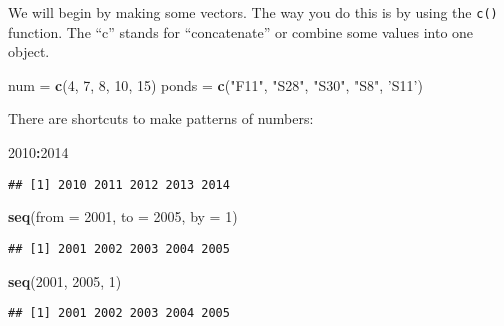 \documentclass[]{book}
\newenvironment{Shaded}{\begin{snugshade}}{\end{snugshade}}
\newcommand{\KeywordTok}[1]{\textcolor[rgb]{0.13,0.29,0.53}{\textbf{#1}}}
\newcommand{\DataTypeTok}[1]{\textcolor[rgb]{0.13,0.29,0.53}{#1}}
\newcommand{\DecValTok}[1]{\textcolor[rgb]{0.00,0.00,0.81}{#1}}
\newcommand{\StringTok}[1]{\textcolor[rgb]{0.31,0.60,0.02}{#1}}
\newcommand{\OperatorTok}[1]{\textcolor[rgb]{0.81,0.36,0.00}{\textbf{#1}}}
\newcommand{\NormalTok}[1]{#1}
\theoremstyle{definition}
\theoremstyle{definition}
\theoremstyle{definition}
\theoremstyle{remark}
\begin{document}
We will begin by making some vectors. The way you do this is by using
the \texttt{c()} function. The ``c'' stands for ``concatenate'' or
combine some values into one object.

\begin{Shaded}
\begin{Highlighting}[]
\NormalTok{num =}\StringTok{ }\KeywordTok{c}\NormalTok{(}\DecValTok{4}\NormalTok{, }\DecValTok{7}\NormalTok{, }\DecValTok{8}\NormalTok{, }\DecValTok{10}\NormalTok{, }\DecValTok{15}\NormalTok{)}
\NormalTok{ponds =}\StringTok{ }\KeywordTok{c}\NormalTok{(}\StringTok{"F11"}\NormalTok{, }\StringTok{"S28"}\NormalTok{, }\StringTok{"S30"}\NormalTok{, }\StringTok{"S8"}\NormalTok{, }\StringTok{'S11'}\NormalTok{)}
\end{Highlighting}
\end{Shaded}

There are shortcuts to make patterns of numbers:

\begin{Shaded}
\begin{Highlighting}[]
\DecValTok{2010}\OperatorTok{:}\DecValTok{2014}
\end{Highlighting}
\end{Shaded}

\begin{verbatim}
## [1] 2010 2011 2012 2013 2014
\end{verbatim}

\begin{Shaded}
\begin{Highlighting}[]
\KeywordTok{seq}\NormalTok{(}\DataTypeTok{from =} \DecValTok{2001}\NormalTok{, }\DataTypeTok{to =} \DecValTok{2005}\NormalTok{, }\DataTypeTok{by =} \DecValTok{1}\NormalTok{)}
\end{Highlighting}
\end{Shaded}

\begin{verbatim}
## [1] 2001 2002 2003 2004 2005
\end{verbatim}

\begin{Shaded}
\begin{Highlighting}[]
\KeywordTok{seq}\NormalTok{(}\DecValTok{2001}\NormalTok{, }\DecValTok{2005}\NormalTok{, }\DecValTok{1}\NormalTok{)}
\end{Highlighting}
\end{Shaded}

\begin{verbatim}
## [1] 2001 2002 2003 2004 2005
\end{verbatim}
\end{document}
